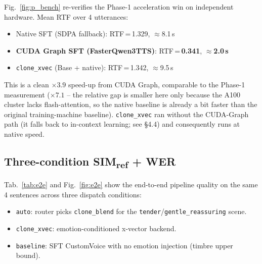 \documentclass[10pt,a4paper]{article}
\begin{document}
Fig.~\ref{fig:p_bench} re-verifies the Phase-1 acceleration win on
independent hardware. Mean RTF over 4 utterances:

\begin{itemize}
  \item Native SFT (SDPA fallback): RTF\,=\,1.329, $\approx$8.1\,s
  \item \textbf{CUDA Graph SFT (FasterQwen3TTS)}: RTF\,=\,\textbf{0.341}, $\approx$\textbf{2.0\,s}
  \item \texttt{clone\_xvec} (Base + native): RTF\,=\,1.342, $\approx$9.5\,s
\end{itemize}

This is a clean $\times3.9$ speed-up from CUDA Graph, comparable to the
Phase-1 measurement ($\times7.1$ -- the relative gap is smaller here only
because the A100 cluster lacks flash-attention, so the native baseline is
already a bit faster than the original training-machine baseline).
\texttt{clone\_xvec} ran without the CUDA-Graph path (it falls back to
in-context learning; see \S4.4) and consequently runs at native speed.

\subsection{Three-condition SIM\textsubscript{ref} + WER}

Tab.~\ref{tab:e2e} and Fig.~\ref{fig:e2e} show the end-to-end pipeline
quality on the same 4 sentences across three dispatch conditions:

\begin{itemize}
  \item \texttt{auto}: router picks \texttt{clone\_blend} for the
        \texttt{tender}/\texttt{gentle\_reassuring} scene.
  \item \texttt{clone\_xvec}: emotion-conditioned x-vector backend.
  \item \texttt{baseline}: SFT CustomVoice with no emotion injection
        (timbre upper bound).
\end{itemize}
\end{document}
